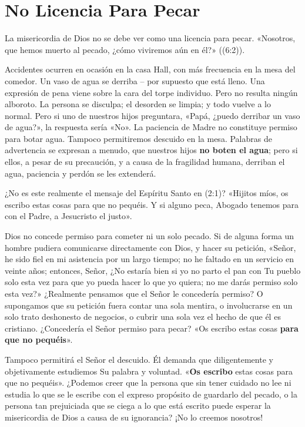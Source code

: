 \documentclass[12pt, twoside, openright]{book}
\begin{document}
\section{No Licencia Para Pecar}
La misericordia de Dios no se debe ver como una licencia para pecar. «Nosotros, que hemos muerto al pecado, ¿cómo viviremos aún en él?» ((6:2)). 

Accidentes ocurren en ocasión en la casa Hall, con más frecuencia en la mesa del comedor. Un vaso de agua se derriba – por supuesto que está lleno. Una expresión de pena viene sobre la cara del torpe individuo. Pero no resulta ningún alboroto. La persona se disculpa; el desorden se limpia; y todo vuelve a lo normal. Pero si uno de nuestros hijos preguntara, «Papá, ¿puedo derribar un vaso de agua?», la respuesta sería «No». La paciencia de Madre no constituye permiso para botar agua. Tampoco permitiremos descuido en la mesa. Palabras de advertencia se expresan a menudo, que nuestros hijos \textbf{no boten el agua}; pero si ellos, a pesar de su precaución, y a causa de la fragilidad humana, derriban el agua, paciencia y perdón se les extenderá. 

¿No es este realmente el mensaje del Espíritu Santo en (2:1)? «Hijitos míos, os escribo estas cosas para que no pequéis. Y si alguno peca, Abogado tenemos para con el Padre, a Jesucristo el justo».

Dios no concede permiso para cometer ni un solo pecado. Si de alguna forma un hombre pudiera comunicarse directamente con Dios, y hacer su petición, «Señor, he sido fiel en mi asistencia por un largo tiempo; no he faltado en un servicio en veinte años; entonces, Señor, ¿No estaría bien si yo no parto el pan con Tu pueblo solo esta vez para que yo pueda hacer lo que yo quiera; no me darás permiso solo esta vez?» ¿Realmente pensamos que el Señor le concedería permiso? O supongamos que su petición fuera contar una sola mentira, o involucrarse en un solo trato deshonesto de negocios, o cubrir una sola vez el hecho de que él es cristiano. ¿Concedería el Señor permiso para pecar? «Os escribo estas cosas \textbf{para que no pequéis}».

Tampoco permitirá el Señor el descuido. Él demanda que diligentemente y objetivamente estudiemos Su palabra y voluntad. «\textbf{Os escribo} estas cosas para que no pequéis». ¿Podemos creer que la persona que sin tener cuidado no lee ni estudia lo que se le escribe con el expreso propósito de guardarlo del pecado, o la persona tan prejuiciada que se ciega a lo que está escrito puede esperar la misericordia de Dios a causa de su ignorancia? ¡No lo creemos nosotros!
\end{document}
